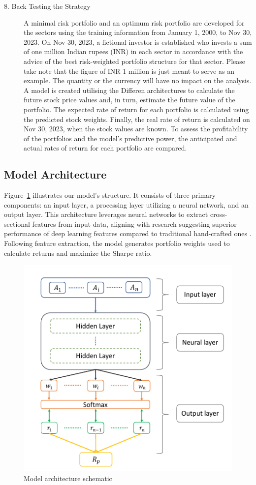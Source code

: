 \begin{description}
\item [8. Back Testing the Strategy] A minimal risk portfolio and an optimum risk portfolio are developed for the sectors using the training information from January 1, 2000, to Nov 30, 2023. On Nov 30, 2023, a fictional investor is established who invests a sum of one million Indian rupees (INR) in each sector in accordance with the advice of the best risk-weighted portfolio structure for that sector. Please take note that the figure of INR 1 million is just meant to serve as an example. The quantity or the currency will have no impact on the analysis. A model is created utilising the Differen architectures to calculate the future stock price values and, in turn, estimate the future value of the portfolio. The expected rate of return for each portfolio is calculated using the predicted stock weights. Finally, the real rate of return is calculated on Nov 30, 2023, when the stock values are known. To assess the profitability of the portfolios and the model's predictive power, the anticipated and actual rates of return for each portfolio are compared.
\end{description}

\subsection{Model Architecture}

Figure~\ref{fig:network_architecture1} illustrates our model's structure. It consists of three primary components: an input layer, a processing layer utilizing a neural network, and an output layer. This architecture leverages neural networks to extract cross-sectional features from input data, aligning with research suggesting superior performance of deep learning features compared to traditional hand-crafted ones \citep{Zhang202025}. Following feature extraction, the model generates portfolio weights used to calculate returns and maximize the Sharpe ratio. 
\begin{figure}[H]
   \centering
   \includegraphics[width=0.5\linewidth]{images/model_schema.png}
   \caption{Model architecture schematic}
   \label{fig:network_architecture1}
 \end{figure}
 
